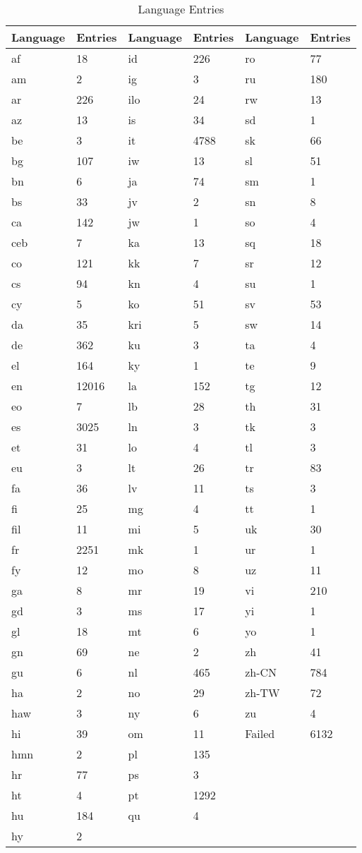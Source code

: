\begin{table}[!htbp]
\centering
\begin{tabular}{llllll}
\textbf{Language} & \textbf{Entries} & \textbf{Language} & \textbf{Entries} & \textbf{Language} & \textbf{Entries} \\
\hline
af & 18 & id & 226 & ro & 77 \\
am & 2 & ig & 3 & ru & 180 \\
ar & 226 & ilo & 24 & rw & 13 \\
az & 13 & is & 34 & sd & 1 \\
be & 3 & it & 4788 & sk & 66 \\
bg & 107 & iw & 13 & sl & 51 \\
bn & 6 & ja & 74 & sm & 1 \\
bs & 33 & jv & 2 & sn & 8 \\
ca & 142 & jw & 1 & so & 4 \\
ceb & 7 & ka & 13 & sq & 18 \\
co & 121 & kk & 7 & sr & 12 \\
cs & 94 & kn & 4 & su & 1 \\
cy & 5 & ko & 51 & sv & 53 \\
da & 35 & kri & 5 & sw & 14 \\
de & 362 & ku & 3 & ta & 4 \\
el & 164 & ky & 1 & te & 9 \\
en & 12016 & la & 152 & tg & 12 \\
eo & 7 & lb & 28 & th & 31 \\
es & 3025 & ln & 3 & tk & 3 \\
et & 31 & lo & 4 & tl & 3 \\
eu & 3 & lt & 26 & tr & 83 \\
fa & 36 & lv & 11 & ts & 3 \\
fi & 25 & mg & 4 & tt & 1 \\
fil & 11 & mi & 5 & uk & 30 \\
fr & 2251 & mk & 1 & ur & 1 \\
fy & 12 & mo & 8 & uz & 11 \\
ga & 8 & mr & 19 & vi & 210 \\
gd & 3 & ms & 17 & yi & 1 \\
gl & 18 & mt & 6 & yo & 1 \\
gn & 69 & ne & 2 & zh & 41 \\
gu & 6 & nl & 465 & zh-CN & 784 \\
ha & 2 & no & 29 & zh-TW & 72 \\
haw & 3 & ny & 6 & zu & 4 \\
hi & 39 & om & 11 & Failed & 6132 \\
hmn & 2 & pl & 135 & \ & \ \\
hr & 77 & ps & 3 & \ & \ \\
ht & 4 & pt & 1292 & \ & \ \\
hu & 184 & qu & 4 & \ & \ \\
hy & 2 & \ & \ & \ & \ \\
\end{tabular}
\caption{Language Entries}
\label{appendix01:tab:language_distribution}
\end{table}
